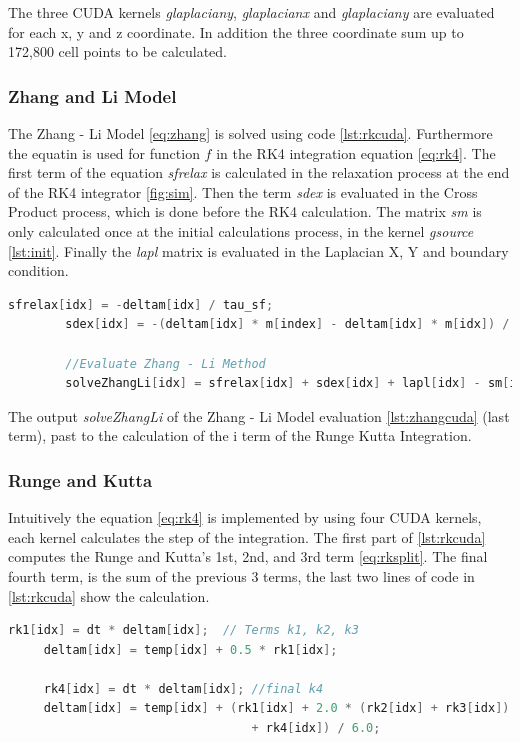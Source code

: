 The three CUDA kernels \textit{glaplaciany}, \textit{glaplacianx} and \textit{glaplaciany} are evaluated for each x, y and z coordinate. In addition the three coordinate sum up to 172,800 cell points to be calculated.

\subsubsection{Zhang and Li Model}

The Zhang - Li Model \ref{eq:zhang} is solved using code \ref{lst:rkcuda}. Furthermore the equatin is used for function $f$ in the RK4 integration equation \ref{eq:rk4}. The first term of the equation \textit{sfrelax} is calculated in the relaxation process at the end of the RK4 integrator \ref{fig:sim}. Then the term \textit{sdex} is evaluated in the Cross Product process, which is done before the RK4 calculation. The matrix \textit{sm} is only calculated once at the initial calculations process, in the kernel \textit{gsource} \ref{lst:init}. Finally the \textit{lapl} matrix is evaluated in the Laplacian X, Y and boundary condition.

\begin{lstlisting}[language=C++, label={lst:zhangcuda}, caption={Runge and Kutta 4th Terms}]
		sfrelax[idx] = -deltam[idx] / tau_sf;
		sdex[idx] = -(deltam[idx] * m[index] - deltam[idx] * m[idx]) / tau_sd;
		
		//Evaluate Zhang - Li Method
        solveZhangLi[idx] = sfrelax[idx] + sdex[idx] + lapl[idx] - sm[idx];
\end{lstlisting}

The output  \textit{solveZhangLi} of the Zhang - Li Model evaluation \ref{lst:zhangcuda}  (last term), past to the calculation of the i term of the Runge Kutta Integration.

\subsubsection{Runge and Kutta}
 
Intuitively the equation \ref{eq:rk4} is implemented by using four CUDA kernels, each kernel calculates the step of the integration. The first part of \ref{lst:rkcuda} computes the Runge and Kutta's 1st, 2nd, and 3rd  term \ref{eq:rksplit}. The final fourth term, is the sum of the previous 3 terms, the last two lines of code in \ref{lst:rkcuda} show the calculation.

\begin{lstlisting}[language=C++, label={lst:rkcuda}, caption={Runge and Kutta 4th Terms}]
     rk1[idx] = dt * deltam[idx];  // Terms k1, k2, k3
     deltam[idx] = temp[idx] + 0.5 * rk1[idx];
     
     rk4[idx] = dt * deltam[idx]; //final k4
     deltam[idx] = temp[idx] + (rk1[idx] + 2.0 * (rk2[idx] + rk3[idx])
                                  + rk4[idx]) / 6.0;
\end{lstlisting}


